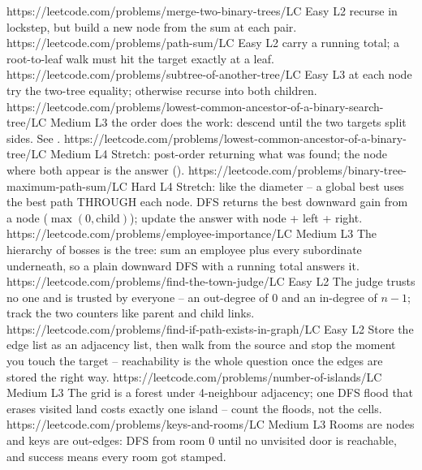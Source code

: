 \begin{mixedset}
    {https://leetcode.com/problems/merge-two-binary-trees/}{LC Easy L2}
    {recurse in lockstep, but build a new node from the sum at each pair.}
    {https://leetcode.com/problems/path-sum/}{LC Easy L2}
    {carry a running total; a root-to-leaf walk must hit the target exactly at a leaf.}
    {https://leetcode.com/problems/subtree-of-another-tree/}{LC Easy L3}
    {at each node try the two-tree equality; otherwise recurse into both children.}
    {https://leetcode.com/problems/lowest-common-ancestor-of-a-binary-search-tree/}{LC Medium L3}
    {the order does the work: descend until the two targets split sides. See .}
    {https://leetcode.com/problems/lowest-common-ancestor-of-a-binary-tree/}{LC Medium L4}
    {Stretch: post-order returning what was found; the node where both appear is the answer ().}
    {https://leetcode.com/problems/binary-tree-maximum-path-sum/}{LC Hard L4}
    {Stretch: like the diameter -- a global best uses the best path THROUGH each node.}
    {DFS returns the best downward gain from a node ($\max(0, \text{child})$); update the answer with node + left + right.}
    {https://leetcode.com/problems/employee-importance/}{LC Medium L3}
    {The hierarchy of bosses is the tree: sum an employee plus every subordinate
    underneath, so a plain downward DFS with a running total answers it.}
    {https://leetcode.com/problems/find-the-town-judge/}{LC Easy L2}
    {The judge trusts no one and is trusted by everyone -- an out-degree of 0 and an
    in-degree of $n-1$; track the two counters like parent and child links.}
    {https://leetcode.com/problems/find-if-path-exists-in-graph/}{LC Easy L2}
    {Store the edge list as an adjacency list, then walk from the source and stop the
    moment you touch the target -- reachability is the whole question once the
    edges are stored the right way.}
    {https://leetcode.com/problems/number-of-islands/}{LC Medium L3}
    {The grid is a forest under 4-neighbour adjacency; one DFS flood that erases
    visited land costs exactly one island -- count the floods, not the cells.}
    {https://leetcode.com/problems/keys-and-rooms/}{LC Medium L3}
    {Rooms are nodes and keys are out-edges: DFS from room 0 until no unvisited door
    is reachable, and success means every room got stamped.}
\end{mixedset}

